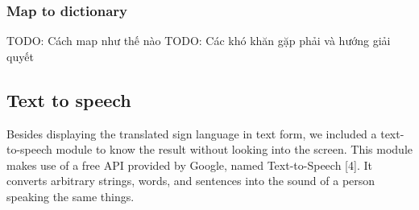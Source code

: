       
    \subsubsection{ Map to dictionary }
      TODO: Cách map như thế nào
      TODO: Các khó khăn gặp phải và hướng giải quyết


\subsection{Text to speech}

Besides displaying the translated sign language in text form, we included a text-to-speech module to know the result without looking into the screen. This module makes use of a free API provided by Google, named Text-to-Speech [4]. It converts arbitrary strings, words, and sentences into the sound of a person speaking the same things.
